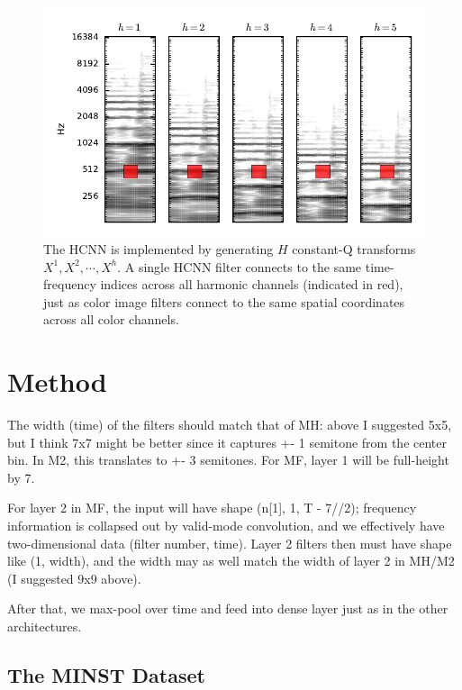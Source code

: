 \documentclass{article}
\begin{document}
\begin{figure}
    \includegraphics[width=\columnwidth]{figs/hcnn}
    \caption{The HCNN is implemented by generating $H$ constant-Q transforms $X^1, X^2, \cdots, X^h$.
    A single HCNN filter connects to the same time-frequency indices across all harmonic channels (indicated in red), just as color image filters connect to the same spatial coordinates across all color channels.}
\label{fig:hcnn}
\end{figure}

\section{Method}\label{sec:typeset_text}

The width (time) of the filters should match that of MH: above I suggested 5x5, but I think 7x7 might be better since it captures +- 1 semitone from the center bin. In M2, this translates to +- 3 semitones. For MF, layer 1 will be full-height by 7.

For layer 2 in MF, the input will have shape (n[1], 1, T - 7//2); frequency information is collapsed out by valid-mode convolution, and we effectively have two-dimensional data (filter number, time). Layer 2 filters then must have shape like (1, width), and the width may as well match the width of layer 2 in MH/M2 (I suggested 9x9 above).

After that, we max-pool over time and feed into dense layer just as in the other architectures.




\subsection{The MINST Dataset}\label{subsec:body}
\end{document}
